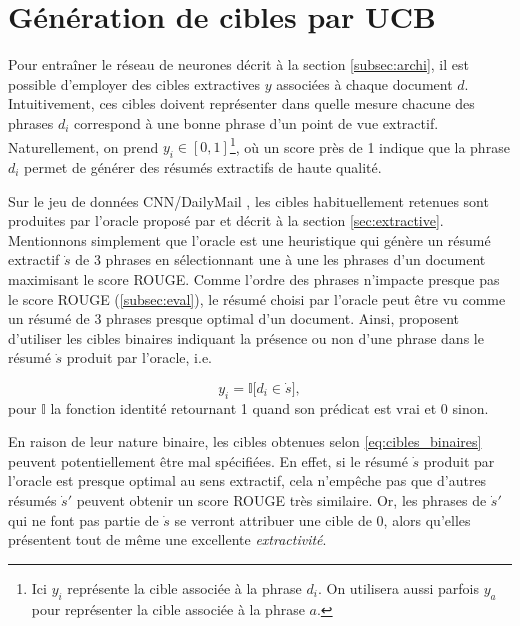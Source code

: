 \section{Génération de cibles par UCB}
\label{sec:cibles_ucb}

Pour entraîner le réseau de neurones décrit à la section
\ref{subsec:archi}, il est possible d'employer 
des cibles extractives $y$ associées à chaque document $d$.
Intuitivement, ces cibles doivent représenter 
dans quelle mesure chacune des phrases $d_i$
correspond à une bonne phrase d'un point de vue extractif.
Naturellement, on prend $y_i \in [0, 1]$\footnote{Ici $y_i$ 
représente la cible associée à la phrase $d_i$. On utilisera aussi parfois $y_a$
pour représenter la cible associée à la phrase $a$.}, où un score 
près de 1 indique que la phrase $d_i$ permet de générer 
des résumés extractifs de haute qualité.

Sur le jeu de données CNN/DailyMail \citep{hermann2015teaching},
les cibles habituellement retenues sont produites par 
l'oracle proposé par \citet{10.5555/3298483.3298681} et décrit 
à la section \ref{sec:extractive}.
Mentionnons simplement que l'oracle est une heuristique qui 
génère un résumé extractif $\dot{s}$ de 3 phrases en sélectionnant 
une à une les phrases d'un document maximisant le score 
ROUGE.
Comme l'ordre des phrases n'impacte presque pas le score ROUGE (\ref{subsec:eval}),
le résumé choisi par l'oracle 
peut être vu comme un résumé de 3 phrases presque optimal
d'un document.
Ainsi, \citet{10.5555/3298483.3298681} proposent d'utiliser 
les cibles binaires indiquant la présence ou non d'une phrase 
dans le résumé $\dot{s}$ produit par l'oracle, i.e.

\begin{equation}
    y_i = \mathbb{I}\big[d_i \in \dot{s}\big],
    \label{eq:cibles_binaires}
\end{equation}
pour $\mathbb{I}$ la fonction identité retournant 1 quand 
son prédicat est vrai et 0 sinon.

En raison de leur nature binaire, les cibles obtenues selon \eqref{eq:cibles_binaires}
peuvent potentiellement être mal spécifiées.
En effet, si le résumé $\dot{s}$ produit par l'oracle est 
presque optimal au sens extractif, cela n'empêche pas 
que d'autres résumés $\dot{s}'$ peuvent obtenir un score ROUGE
très similaire. 
Or, les phrases de $\dot{s}'$ qui ne font pas partie de $\dot{s}$
se verront attribuer une cible de 0, alors qu'elles présentent 
tout de même une excellente \textit{extractivité}.

